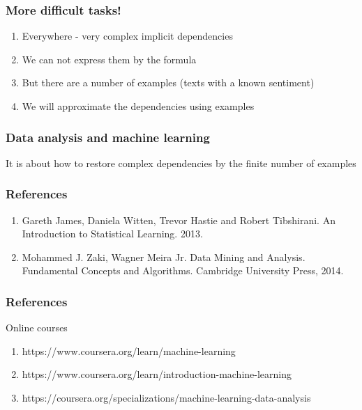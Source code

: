 \documentclass[default]{beamer}
\begin{document}
	\begin{frame}
		\frametitle{More difficult tasks!}
		
		\Large
		\begin{enumerate}
			\item Everywhere - very complex implicit dependencies
			\item We can not express them by the formula
			\item But there are a number of examples (texts with a known sentiment)
			\item We will approximate the dependencies using examples
		\end{enumerate}
		
	\end{frame}

	\begin{frame}
		\frametitle{Data analysis and machine learning}
		
		\Large
		It is about how to restore complex dependencies by the finite number of examples
		
		
	\end{frame}

	\begin{frame}
		\frametitle{References}
		
		\Large
		\begin{enumerate}
			\item Gareth James, Daniela Witten, Trevor Hastie and Robert Tibshirani. An	Introduction to Statistical Learning. 2013.
			\item Mohammed J. Zaki, Wagner Meira Jr. Data Mining and Analysis. Fundamental Concepts and Algorithms. Cambridge University Press, 2014.
		\end{enumerate}
		
	\end{frame}

	\begin{frame}
		\frametitle{References}
		
		\Large
		Online courses
		\begin{enumerate}
			\item https://www.coursera.org/learn/machine-learning
			\item https://www.coursera.org/learn/introduction-machine-learning
			\item https://coursera.org/specializations/machine-learning-data-analysis
		\end{enumerate}
		
	\end{frame}
\end{document}
